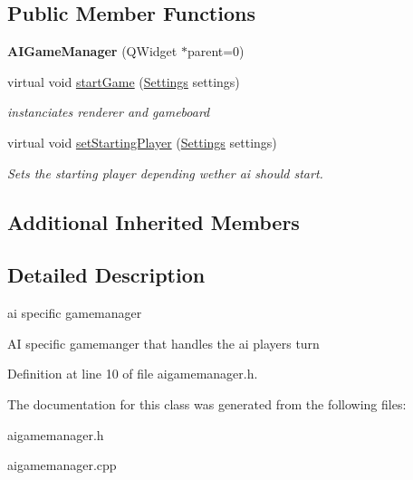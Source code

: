 \subsection*{Public Member Functions}
\begin{DoxyCompactItemize}
\item 
\hypertarget{class_a_i_game_manager_a488945627859aff9401f1280f123bdc4}{{\bfseries A\-I\-Game\-Manager} (Q\-Widget $\ast$parent=0)}\label{class_a_i_game_manager_a488945627859aff9401f1280f123bdc4}

\item 
\hypertarget{class_a_i_game_manager_a00ceeb80c83e9b7951442ce695b9730f}{virtual void \hyperlink{class_a_i_game_manager_a00ceeb80c83e9b7951442ce695b9730f}{start\-Game} (\hyperlink{struct_settings}{Settings} settings)}\label{class_a_i_game_manager_a00ceeb80c83e9b7951442ce695b9730f}

\begin{DoxyCompactList}\small\item\em instanciates renderer and gameboard \end{DoxyCompactList}\item 
\hypertarget{class_a_i_game_manager_a91068d6c5076821cd5361efdbbc68fef}{virtual void \hyperlink{class_a_i_game_manager_a91068d6c5076821cd5361efdbbc68fef}{set\-Starting\-Player} (\hyperlink{struct_settings}{Settings} settings)}\label{class_a_i_game_manager_a91068d6c5076821cd5361efdbbc68fef}

\begin{DoxyCompactList}\small\item\em Sets the starting player depending wether ai should start. \end{DoxyCompactList}\end{DoxyCompactItemize}
\subsection*{Additional Inherited Members}


\subsection{Detailed Description}
ai specific gamemanager 

A\-I specific gamemanger that handles the ai players turn 

Definition at line 10 of file aigamemanager.\-h.



The documentation for this class was generated from the following files\-:\begin{DoxyCompactItemize}
\item 
aigamemanager.\-h\item 
aigamemanager.\-cpp\end{DoxyCompactItemize}
